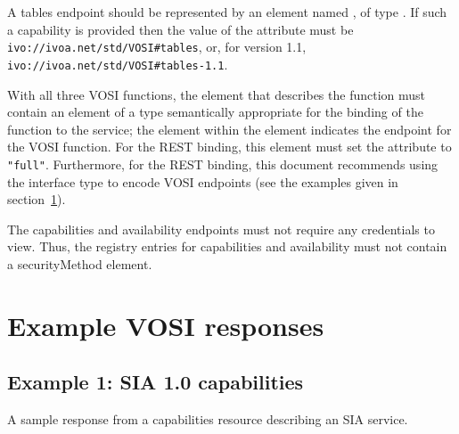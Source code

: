 \documentclass[11pt,letter]{ivoa}
\begin{document}
A tables endpoint should be represented by an element named
, of type
. If such a
capability is provided then the value of the 
attribute must be \nolinkurl{ivo://ivoa.net/std/VOSI\#tables}, or, for
version 1.1, \nolinkurl{ivo://ivoa.net/std/VOSI\#tables-1.1}.

With all three VOSI functions, the  element that
describes the function must contain an  element of a
type semantically appropriate for the binding of the function to the
service; the  element within the 
element indicates the endpoint for the VOSI function. For the REST
binding, this  element must set the 
attribute to \texttt{"full"}. Furthermore, for the REST binding, this
document recommends using the
 interface
type to encode VOSI endpoints (see the examples given in
section~\ref{sec:examples}). 

The capabilities and availability endpoints must not require any
credentials to view.  Thus, the  registry entries for
capabilities and availability must not contain a securityMethod element.

\section{Example VOSI responses}
\label{sec:examples}

\subsection{Example 1: SIA 1.0 capabilities}

A sample response from a capabilities resource describing an SIA service. 
\end{document}
